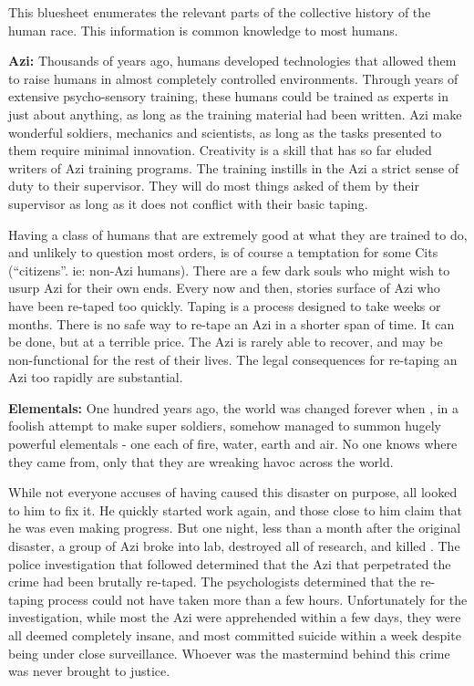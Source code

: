 \documentclass[blue]{elementals}
\begin{document}
\name{\bTest{}}

This bluesheet enumerates the relevant parts of the collective history of the human race. This information is common knowledge to most humans.

{\bf Azi:} %
Thousands of years ago, humans developed technologies that allowed them to raise humans in almost completely controlled environments. Through years of extensive psycho-sensory training, these humans could be trained as experts in just about anything, as long as the training material had been written. Azi make wonderful soldiers, mechanics and scientists, as long as the tasks presented to them require minimal innovation. Creativity is a skill that has so far eluded writers of Azi training programs. The training instills in the Azi a strict sense of duty to their supervisor. They will do most things asked of them by their supervisor as long as it does not conflict with their basic taping.

Having a class of humans that are extremely good at what they are trained to do, and unlikely to question most orders, is of course a temptation for some Cits (``citizens''. ie: non-Azi humans). There are a few dark souls who might wish to usurp Azi for their own ends. Every now and then, stories surface of Azi who have been re-taped too quickly.  Taping is a process designed to take weeks or months. There is no safe way to re-tape an Azi in a shorter span of time. It can be done, but at a terrible price. The Azi is rarely able to recover, and may be non-functional for the rest of their lives.  The legal consequences for re-taping an Azi too rapidly are substantial. %

{\bf Elementals:}
One hundred years ago, the world was changed forever when \cGrandfather{}, in a foolish attempt to make super soldiers, somehow managed to summon hugely powerful elementals - one each of fire, water, earth and air. No one knows where they came from, only that they are wreaking havoc across the world. 

While not everyone accuses \cGrandfather{} of having caused this disaster on purpose, all looked to him to fix it. He quickly started work again, and those close to him claim that he was even making progress. But one night, less than a month after the original disaster, a group of Azi broke into \cGrandfather{\their} lab, destroyed all of \cGrandfather{\their} research, and killed \cGrandfather{\them}. The police investigation that followed determined that the Azi that perpetrated the crime had been brutally re-taped. The psychologists determined that the re-taping process could not have taken more than a few hours. Unfortunately for the investigation, while most the Azi were apprehended within a few days, they were all deemed completely insane, and most committed suicide within a week despite being under close surveillance. Whoever was the mastermind behind this crime was never brought to justice.
\end{document}
